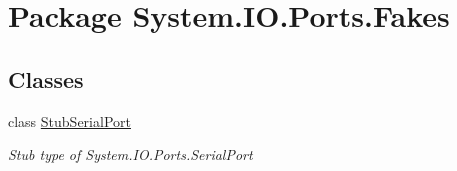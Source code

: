 \hypertarget{namespace_system_1_1_i_o_1_1_ports_1_1_fakes}{\section{Package System.\-I\-O.\-Ports.\-Fakes}
\label{namespace_system_1_1_i_o_1_1_ports_1_1_fakes}
}
\subsection*{Classes}
\begin{DoxyCompactItemize}
\item 
class \hyperlink{class_system_1_1_i_o_1_1_ports_1_1_fakes_1_1_stub_serial_port}{Stub\-Serial\-Port}
\begin{DoxyCompactList}\small\item\em Stub type of System.\-I\-O.\-Ports.\-Serial\-Port\end{DoxyCompactList}\end{DoxyCompactItemize}

